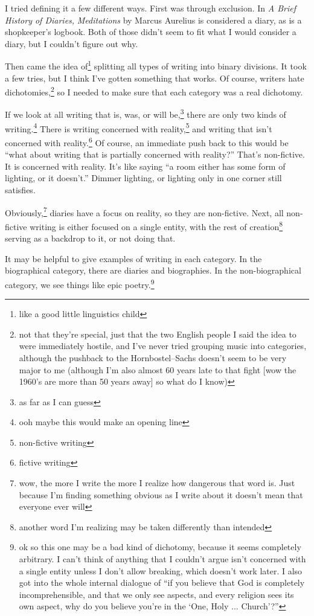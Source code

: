 \documentclass[12pt]{article}[titlepage]
\newcommand{\say}[1]{``#1''}
\newcommand{\nsay}[1]{`#1'}
\newcommand{\1}{\={a}}
\newcommand{\2}{\={e}}
\newcommand{\3}{\={\i}}
\newcommand{\4}{\=o}
\newcommand{\5}{\=u}
\newcommand{\6}{\={A}}
\renewcommand{\,}{\textsuperscript{,}}
\begin{document}
I tried defining it a few different ways.
First was through exclusion.
In \textit{A Brief History of Diaries,} \textit{Meditations} by Marcus Aurelius is considered a diary, as is a shopkeeper's logbook.
Both of those didn't seem to fit what I would consider a diary, but I couldn't figure out why.

Then came the idea of\footnote{like a good little linguistics child} splitting all types of writing into binary divisions.
It took a few tries, but I think I've gotten something that works.
Of course, writers hate dichotomies,\footnote{not that they're special, just that the two English people I said the idea to were immediately hostile, and I've never tried grouping music into categories, although the pushback to the Hornbostel--Sachs doesn't seem to be very major to me (although I'm also almost 60 years late to that fight [wow the 1960's are more than 50 years away] so what do I know)} so I needed to make sure that each category was a real dichotomy.

If we look at all writing that is, was, or will be,\footnote{as far as I can guess} there are only two kinds of writing.\footnote{ooh maybe this would make an opening line}
There is writing concerned with reality,\footnote{non-fictive writing} and writing that isn't concerned with reality.\footnote{fictive writing}
Of course, an immediate push back to this would be \say{what about writing that is partially concerned with reality?}
That's non-fictive.
It is concerned with reality.
It's like saying \say{a room either has some form of lighting, or it doesn't.}
Dimmer lighting, or lighting only in one corner still satisfies.

Obviously,\footnote{wow, the more I write the more I realize how dangerous that word is. Just because I'm finding something obvious as I write about it doesn't mean that everyone ever will} diaries have a focus on reality, so they are non-fictive.
Next, all non-fictive writing is either focused on a single entity, with the rest of creation\footnote{another word I'm realizing may be taken differently than intended} serving as a backdrop to it, or not doing that.

It may be helpful to give examples of writing in each category.
In the biographical category, there are diaries and biographies.
In the non-biographical category, we see things like epic poetry.\footnote{ok so this one may be a bad kind of dichotomy, because it seems completely arbitrary. I can't think of anything that I couldn't argue isn't concerned with a single entity unless I don't allow breaking, which doesn't work later. I also got into the whole internal dialogue of \say{if you believe that God is completely incomprehensible, and that we only see aspects, and every religion sees its own aspect, why do you believe you're in the \nsay{One, Holy ... Church}?}}
\end{document}
